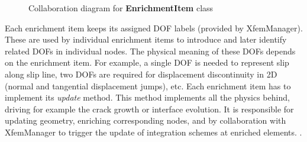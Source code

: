 \documentclass[a4paper]{article}
\newcommand{\class}[1]{{\bf #1}}
\newcommand{\service}[1]{{\em #1}}
\begin{document}
\begin{figure}[ht]
\begin{center}
\ifpdf
{}
\else
{}
\fi
\caption{Collaboration diagram for \class{EnrichmentItem} class}
\label{fig:EnrichmentItem}
\end{center}
\end{figure}

Each enrichment item keeps its assigned DOF labels (provided by XfemManager). These are used by individual enrichment items to introduce and later identify related DOFs in individual nodes. The physical meaning of these DOFs depends on the enrichment item. For example, a single DOF is needed to represent slip along slip line, two DOFs are required for displacement discontinuity in 2D (normal and tangential displacement jumps), etc. Each enrichment item has to implement its \service{update} method. This method implements all the physics behind, driving for example the crack growth or interface evolution. It is responsible for updating geometry, enriching corresponding nodes, and by collaboration with XfemManager to trigger the update of integration schemes at enriched elements. . 
\end{document}
